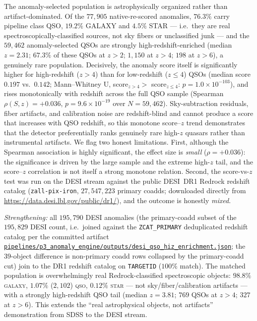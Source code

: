 \documentclass[aps,prd,twocolumn,superscriptaddress,showpacs,preprintnumbers,nofootinbib,longbibliography,floatfix]{revtex4-2}
\newcommand{\repoBase}{https://github.com/Hubify-Projects/bigbounce/blob/main}
\newcommand{\artifact}[1]{\href{\repoBase/#1}{\nolinkurl{#1}}}
\begin{document}
The anomaly-selected population is astrophysically organized rather than artifact-dominated. Of the $77{,}905$ native-re-scored anomalies, $76.3\%$ carry pipeline class QSO, $19.2\%$ GALAXY and $4.5\%$ STAR --- i.e.\ they are real spectroscopically-classified sources, not sky fibers or unclassified junk --- and the $59{,}462$ anomaly-selected QSOs are strongly high-redshift-enriched (median $z = 2.31$; $67.3\%$ of these QSOs at $z>2$; $1{,}150$ at $z>4$; $198$ at $z>6$), a genuinely rare population. Decisively, the anomaly score itself is significantly higher for high-redshift ($z>4$) than for low-redshift ($z\leq4$) QSOs (median score $0.197$ vs.\ $0.142$; Mann--Whitney U, score$_{z>4} >$ score$_{z\leq4}$: $p = 1.0\times10^{-103}$), and rises monotonically with redshift across the full QSO sample (Spearman $\rho(S,z) = +0.036$, $p = 9.6\times10^{-19}$ over $N = 59{,}462$). Sky-subtraction residuals, fiber artifacts, and calibration noise are redshift-blind and cannot produce a score that increases with QSO redshift, so this monotone score--$z$ trend demonstrates that the detector preferentially ranks genuinely rare high-$z$ quasars rather than instrumental artifacts. We flag two honest limitations. First, although the Spearman association is highly significant, the effect size is \emph{small} ($\rho = +0.036$): the significance is driven by the large sample and the extreme high-$z$ tail, and the score--$z$ correlation is not itself a strong monotone relation. Second, the score-vs-$z$ test was run on the DESI stream against the public DESI~DR1 Redrock redshift catalog (\texttt{zall-pix-iron}, $27{,}547{,}223$ primary coadds; downloaded directly from \url{https://data.desi.lbl.gov/public/dr1/}), and the outcome is honestly \emph{mixed}.

\textit{Strengthening:} all $195{,}790$ DESI anomalies (the primary-coadd subset of the $195{,}829$ DESI count, i.e.\ joined against the \texttt{ZCAT\_PRIMARY} deduplicated redshift catalog per the committed artifact \artifact{pipelines/p3\_anomaly\_engine/outputs/desi\_qso\_hiz\_enrichment.json}; the $39$-object difference is non-primary coadd rows collapsed by the primary-coadd cut) join to the DR1 redshift catalog on \texttt{TARGETID} ($100\%$ match). The matched population is overwhelmingly real Redrock-classified spectroscopic objects: $98.8\%$ \textsc{galaxy}, $1.07\%$ ($2{,}102$) \textsc{qso}, $0.12\%$ \textsc{star} --- not sky/fiber/calibration artifacts --- with a strongly high-redshift QSO tail (median $z = 3.81$; $769$ QSOs at $z>4$; $327$ at $z>6$). This extends the ``real astrophysical objects, not artifacts'' demonstration from SDSS to the DESI stream.
\end{document}
